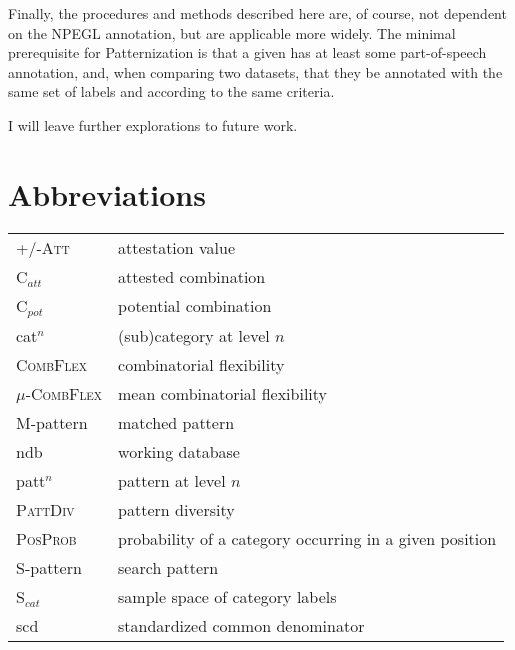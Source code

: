 \documentclass[output=paper,colorlinks,citecolor=brown,draft]{langscibook}
\begin{document}
Finally, the procedures and methods described here are, of course, not dependent on the NPEGL annotation, but are applicable more widely. The minimal prerequisite for Patternization is that a given  has at least some part-of-speech annotation, and, when comparing two datasets,  that they be annotated with the same set of labels and according to the same criteria. 

I will leave further explorations to future work. 

 
\section*{Abbreviations}

\begin{tabularx}{\textwidth}{@{}lQ@{}}
\textsc{+/-Att} & attestation value \\
C$_{att}$ & attested {combination} \\
C$_{pot}$ & potential {combination} \\
cat$^n$ & (sub)category at level $n$ \\
\textsc{CombFlex} & {combinatorial flexibility} \\
$\mu$-\textsc{CombFlex} & mean {combinatorial flexibility} \\
M-{pattern}  & matched {pattern} \\
ndb & working {database} \\
patt$^n$ & {pattern} at level $n$ \\
\textsc{PattDiv} & {pattern} diversity \\
\textsc{PosProb} & probability of a category occurring in a given position \\
S-{pattern} & search {pattern} \\
S$_{cat}$ & sample space of category labels \\
scd & standardized common denominator \\
\end{tabularx}
\end{document}
